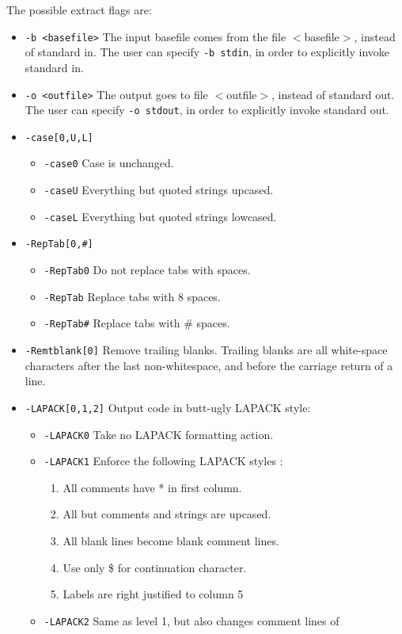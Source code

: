 The possible extract flags are:
\begin{itemize}
\renewcommand{\labelitemii}{\labelitemiv}
\item {\tt -b <basefile>} 
The input basefile comes from the file $<$basefile$>$, instead of standard in.
The user can specify {\tt -b stdin}, in order to explicitly invoke standard in.
\item {\tt -o <outfile>}
The output goes to file $<$outfile$>$, instead of standard out.
The user can specify {\tt -o stdout}, in order to explicitly invoke standard out.
\item {\tt -case[0,U,L]}
   \begin{itemize}
   \item {\tt -case0} Case is unchanged.
   \item {\tt -caseU} Everything but quoted strings upcased.
   \item {\tt -caseL} Everything but quoted strings lowcased.
   \end{itemize}
\item {\tt -RepTab[0,\#]}
   \begin{itemize}
   \item {\tt -RepTab0} Do not replace tabs with spaces.
   \item {\tt -RepTab}  Replace tabs with 8 spaces.
   \item {\tt -RepTab\#} Replace tabs with \# spaces.
   \end{itemize}
\item {\tt -Remtblank[0]} Remove trailing blanks.  Trailing blanks
are all white-space characters after the last non-whitespace, and before the
carriage return of a line.
\item {\tt -LAPACK[0,1,2]}  Output code in butt-ugly LAPACK style:
   \begin{itemize}
   \item {\tt -LAPACK0} Take no LAPACK formatting action.
   \item {\tt -LAPACK1} Enforce the following LAPACK styles :
       \begin{enumerate}
       \item All comments have * in first column.
       \item All but comments and strings are upcased.
       \item All blank lines become blank comment lines.
       \item Use only \$ for continuation character.
       \item Labels are right justified to column 5
       \end{enumerate}
   \item {\tt -LAPACK2} Same as level 1, but also changes comment lines of
\begin{verbatim}


\end{verbatim}
\end{itemize}
\end{itemize}
